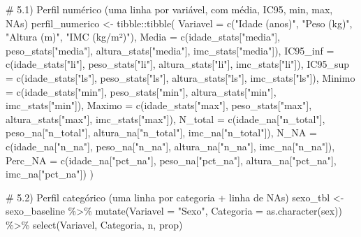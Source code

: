 \documentclass[
]{article}
\newenvironment{Shaded}{\begin{snugshade}}{\end{snugshade}}
\newcommand{\AttributeTok}[1]{\textcolor[rgb]{0.40,0.45,0.13}{#1}}
\newcommand{\CommentTok}[1]{\textcolor[rgb]{0.37,0.37,0.37}{#1}}
\newcommand{\FunctionTok}[1]{\textcolor[rgb]{0.28,0.35,0.67}{#1}}
\newcommand{\NormalTok}[1]{\textcolor[rgb]{0.00,0.23,0.31}{#1}}
\newcommand{\OtherTok}[1]{\textcolor[rgb]{0.00,0.23,0.31}{#1}}
\newcommand{\SpecialCharTok}[1]{\textcolor[rgb]{0.37,0.37,0.37}{#1}}
\newcommand{\StringTok}[1]{\textcolor[rgb]{0.13,0.47,0.30}{#1}}
\begin{document}
\begin{Shaded}
\begin{Highlighting}[]
\CommentTok{\# 5.1) Perfil numérico (uma linha por variável, com média, IC95, min, max, NAs)}
\NormalTok{perfil\_numerico }\OtherTok{\textless{}{-}}\NormalTok{ tibble}\SpecialCharTok{::}\FunctionTok{tibble}\NormalTok{(}
  \AttributeTok{Variavel   =} \FunctionTok{c}\NormalTok{(}\StringTok{"Idade (anos)"}\NormalTok{, }\StringTok{"Peso (kg)"}\NormalTok{, }\StringTok{"Altura (m)"}\NormalTok{, }\StringTok{"IMC (kg/m²)"}\NormalTok{),}
  \AttributeTok{Media      =} \FunctionTok{c}\NormalTok{(idade\_stats[}\StringTok{"media"}\NormalTok{],  peso\_stats[}\StringTok{"media"}\NormalTok{],  altura\_stats[}\StringTok{"media"}\NormalTok{],  imc\_stats[}\StringTok{"media"}\NormalTok{]),}
  \AttributeTok{IC95\_inf   =} \FunctionTok{c}\NormalTok{(idade\_stats[}\StringTok{"li"}\NormalTok{],     peso\_stats[}\StringTok{"li"}\NormalTok{],     altura\_stats[}\StringTok{"li"}\NormalTok{],     imc\_stats[}\StringTok{"li"}\NormalTok{]),}
  \AttributeTok{IC95\_sup   =} \FunctionTok{c}\NormalTok{(idade\_stats[}\StringTok{"ls"}\NormalTok{],     peso\_stats[}\StringTok{"ls"}\NormalTok{],     altura\_stats[}\StringTok{"ls"}\NormalTok{],     imc\_stats[}\StringTok{"ls"}\NormalTok{]),}
  \AttributeTok{Minimo     =} \FunctionTok{c}\NormalTok{(idade\_stats[}\StringTok{"min"}\NormalTok{],    peso\_stats[}\StringTok{"min"}\NormalTok{],    altura\_stats[}\StringTok{"min"}\NormalTok{],    imc\_stats[}\StringTok{"min"}\NormalTok{]),}
  \AttributeTok{Maximo     =} \FunctionTok{c}\NormalTok{(idade\_stats[}\StringTok{"max"}\NormalTok{],    peso\_stats[}\StringTok{"max"}\NormalTok{],    altura\_stats[}\StringTok{"max"}\NormalTok{],    imc\_stats[}\StringTok{"max"}\NormalTok{]),}
  \AttributeTok{N\_total    =} \FunctionTok{c}\NormalTok{(idade\_na[}\StringTok{"n\_total"}\NormalTok{],   peso\_na[}\StringTok{"n\_total"}\NormalTok{],   altura\_na[}\StringTok{"n\_total"}\NormalTok{],   imc\_na[}\StringTok{"n\_total"}\NormalTok{]),}
  \AttributeTok{N\_NA       =} \FunctionTok{c}\NormalTok{(idade\_na[}\StringTok{"n\_na"}\NormalTok{],      peso\_na[}\StringTok{"n\_na"}\NormalTok{],      altura\_na[}\StringTok{"n\_na"}\NormalTok{],      imc\_na[}\StringTok{"n\_na"}\NormalTok{]),}
  \AttributeTok{Perc\_NA    =} \FunctionTok{c}\NormalTok{(idade\_na[}\StringTok{"pct\_na"}\NormalTok{],    peso\_na[}\StringTok{"pct\_na"}\NormalTok{],    altura\_na[}\StringTok{"pct\_na"}\NormalTok{],    imc\_na[}\StringTok{"pct\_na"}\NormalTok{])}
\NormalTok{)}

\CommentTok{\# 5.2) Perfil categórico (uma linha por categoria + linha de NAs)}
\NormalTok{sexo\_tbl }\OtherTok{\textless{}{-}}\NormalTok{ sexo\_baseline }\SpecialCharTok{\%\textgreater{}\%}
  \FunctionTok{mutate}\NormalTok{(}\AttributeTok{Variavel =} \StringTok{"Sexo"}\NormalTok{,}
         \AttributeTok{Categoria =} \FunctionTok{as.character}\NormalTok{(sex)) }\SpecialCharTok{\%\textgreater{}\%}
  \FunctionTok{select}\NormalTok{(Variavel, Categoria, n, prop)}


\end{Highlighting}
\end{Shaded}
\end{document}
